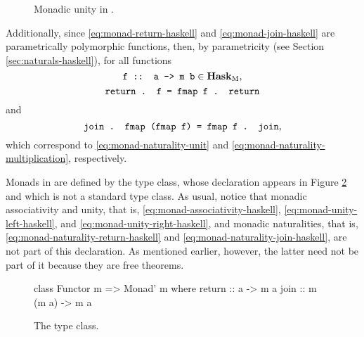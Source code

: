 \begin{figure}[htb]
  \begin{center}
  \end{center}
  \caption{Monadic unity in \hask.}
  \label{fig:monad-unity-haskell}
\end{figure}

Additionally, since 
\eqref{eq:monad-return-haskell} and 
\eqref{eq:monad-join-haskell} are parametrically polymorphic
functions, then, by parametricity (see Section
\ref{sec:naturals-haskell}), for all functions
\begin{equation*}
  \text{\texttt{f :: a -> m b}} \in \mathcal{\mathbf{Hask}}_{\operatorname{M}}
  \text{,}
\end{equation*}
\begin{equation}
  \label{eq:monad-naturality-return-haskell}
  \text{\texttt{return . f = fmap f . return}}
\end{equation}
and
\begin{equation}
  \label{eq:monad-naturality-join-haskell}
  \text{\texttt{join . fmap (fmap f) = fmap f . join}}
  \text{,}
\end{equation}
which correspond to \eqref{eq:monad-naturality-unit} and
\eqref{eq:monad-naturality-multiplication}, respectively.

Monads in \hask are defined by the  type class,
whose declaration appears in Figure \ref{fig:monad-haskell} and which is not a standard type class. As usual,
notice that monadic associativity and unity, that is,
\eqref{eq:monad-associativity-haskell},
\eqref{eq:monad-unity-left-haskell}, and
\eqref{eq:monad-unity-right-haskell}, and monadic naturalities, that
is, \eqref{eq:monad-naturality-return-haskell} and
\eqref{eq:monad-naturality-join-haskell}, are not part of this
declaration. As mentioned earlier, however, the latter need not be
part of it because they are free theorems.
\begin{figure}[htbp]
  \begin{codehaskell}
class Functor m => Monad' m where
  return :: a -> m a
  join   :: m (m a) -> m a
  \end{codehaskell}
  \caption{The  type class.}
  \label{fig:monad-haskell}
\end{figure}

